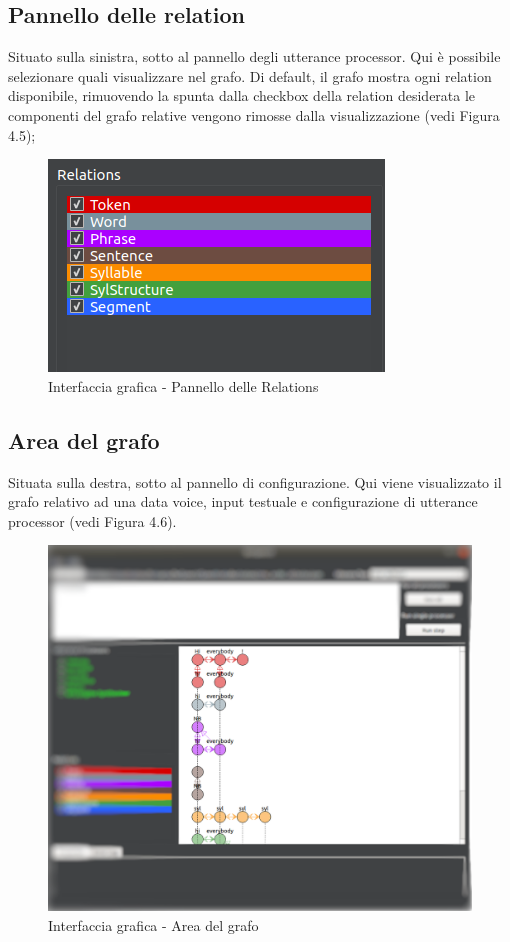 \documentclass[openany,12pt,a4paper]{report}
\begin{document}
 	\subsection{Pannello delle relation}
 	Situato sulla sinistra, sotto al pannello degli utterance processor. Qui è possibile selezionare quali  visualizzare nel grafo. Di default, il grafo mostra ogni relation disponibile, rimuovendo la spunta dalla checkbox della relation desiderata le componenti del grafo relative vengono rimosse dalla visualizzazione (vedi Figura 4.5);
 		\begin{figure}[H]
 			
 			\centering
 			
 				\includegraphics[width=.4\textwidth]{./img/relations}
 			
 			\caption{Interfaccia grafica - Pannello delle Relations}
 			
 		\end{figure}
 	
 	\subsection{Area del grafo}
 	Situata sulla destra, sotto al pannello di configurazione. Qui viene visualizzato il grafo relativo ad una data voice, input testuale e configurazione di utterance processor (vedi Figura 4.6).
 		\begin{figure}[H]
 			
 			\centering
 			
 				\includegraphics[scale=0.3]{./img/graph-area}
 			
 			\caption{Interfaccia grafica - Area del grafo}
 			
 		\end{figure}
 	
\end{document}
